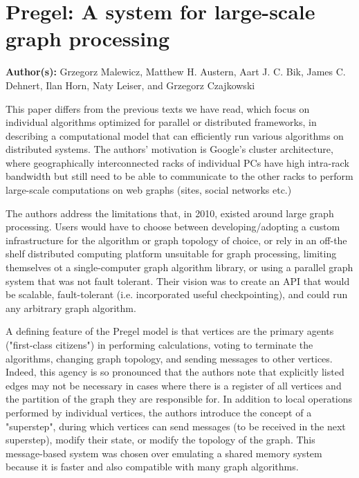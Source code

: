 \section{Pregel: A system for large-scale graph processing}

\textbf{Author(s):} Grzegorz Malewicz, Matthew H. Austern, Aart J. C. Bik, James C. Dehnert, Ilan Horn, Naty Leiser, and Grzegorz Czajkowski

This paper differs from the previous texts we have read, which focus on individual algorithms optimized for parallel or distributed frameworks, in describing a computational model that can efficiently run various algorithms on distributed systems. The authors' motivation is Google's cluster architecture, where geographically interconnected racks of individual PCs have high intra-rack bandwidth but still need to be able to communicate to the other racks to perform large-scale computations on web graphs (sites, social networks etc.)

The authors address the limitations that, in 2010, existed around large graph processing. Users would have to choose between developing/adopting a custom infrastructure for the algorithm or graph topology of choice, or rely in an off-the shelf distributed computing platform unsuitable for graph processing, limiting themselves ot a single-computer graph algorithm library, or using a parallel graph system that was not fault tolerant. Their vision was to create an API that would be scalable, fault-tolerant (i.e. incorporated useful checkpointing), and could run any arbitrary graph algorithm. 

A defining feature of the Pregel model is that vertices are the primary agents ("first-class citizens") in performing calculations, voting to terminate the algorithms, changing graph topology, and sending messages to other vertices. Indeed, this agency is so pronounced that the authors note that explicitly listed edges may not be necessary in cases where there is a register of all vertices and the partition of the graph they are responsible for. In addition to local operations performed by individual vertices, the authors introduce the concept of a "superstep", during which vertices can send messages (to be received in the next superstep), modify their state, or modify the topology of the graph. This message-based system was chosen over emulating a shared memory system because it is faster and also compatible with many graph algorithms. 

